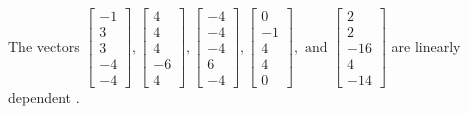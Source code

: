 \begin{exercise}
\begin{exerciseStatement}
  \end{exerciseStatement}
  \begin{exerciseAnswer}
   The vectors \(\left[\begin{array}{r}
-1 \\
3 \\
3 \\
-4 \\
-4
\end{array}\right] , \left[\begin{array}{r}
4 \\
4 \\
4 \\
-6 \\
4
\end{array}\right] , \left[\begin{array}{r}
-4 \\
-4 \\
-4 \\
6 \\
-4
\end{array}\right] , \left[\begin{array}{r}
0 \\
-1 \\
4 \\
4 \\
0
\end{array}\right] , \text{ and } \left[\begin{array}{r}
2 \\
2 \\
-16 \\
4 \\
-14
\end{array}\right]\) are 
  	 linearly dependent  .
  


  \end{exerciseAnswer}
\end{exercise}